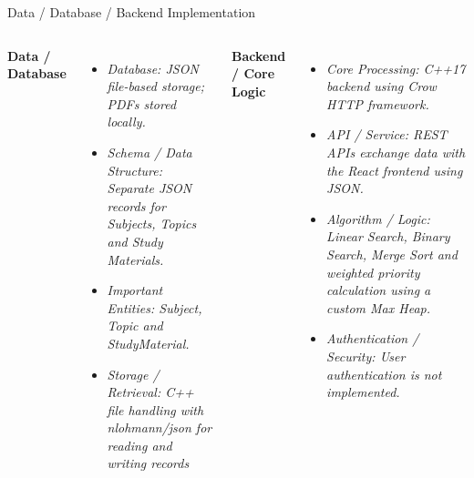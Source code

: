 \documentclass[aspectratio=169,11pt]{beamer}
\newcommand{\placeholder}[1]{%
\textit{\color{GEUGrey}#1}
}
\begin{document}
\begin{frame}{Data / Database / Backend Implementation}

\begin{columns}[T,totalwidth=\textwidth]

\vspace{-0.8cm}
\textbf{\color{GEUBlue}Data / Database}

\begin{itemize}\itemsep3pt
    \item \placeholder{Database: JSON file-based storage; PDFs stored locally.}
    \item \placeholder{Schema / Data Structure: Separate JSON records for Subjects, Topics and Study Materials.}
    \item \placeholder{Important Entities: Subject, Topic and StudyMaterial.}
    \item \placeholder{Storage / Retrieval: C++ file handling with nlohmann/json for reading and writing records}
\end{itemize}

\vspace{-0.8cm}
\textbf{\color{GEUBlue}Backend / Core Logic}

\begin{itemize}\itemsep3pt
    \item \placeholder{Core Processing: C++17 backend using Crow HTTP framework.}
    \item \placeholder{API / Service: REST APIs exchange data with the React frontend using JSON.}
    \item \placeholder{Algorithm / Logic: Linear Search, Binary Search, Merge Sort and weighted priority calculation using a custom Max Heap.}
    \item \placeholder{Authentication / Security: User authentication is not implemented.}
\end{itemize}

\end{columns}

\vfill

\end{frame}
\end{document}

